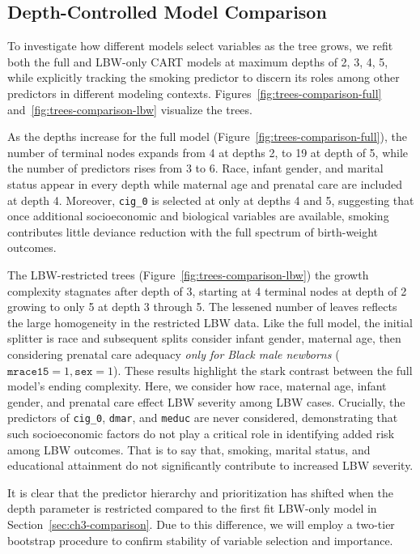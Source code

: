 \subsection{Depth-Controlled Model Comparison}
\label{sec:ch3-comparison-depth}

To investigate how different models select variables as the tree grows, we refit both the full and LBW-only CART models at maximum depths of 2, 3, 4, 5, while explicitly tracking the smoking predictor to discern its roles among other predictors in different modeling contexts. Figures~\ref{fig:trees-comparison-full} and~\ref{fig:trees-comparison-lbw} visualize the trees.

As the depths increase for the full model (Figure~\ref{fig:trees-comparison-full}), the number of terminal nodes expands from 4 at depths 2, to 19 at depth of 5, while the number of predictors rises from 3 to 6. Race, infant gender, and marital status appear in every depth while maternal age and prenatal care are included at depth 4. Moreover,  \texttt{cig\_0} is selected at only at depths 4 and 5, suggesting that once additional socioeconomic and biological variables are available, smoking contributes little deviance reduction with the full spectrum of birth-weight outcomes. 

The LBW-restricted trees (Figure~\ref{fig:trees-comparison-lbw}) the growth complexity stagnates after depth of 3, starting at 4 terminal nodes at depth of 2 growing to only 5 at depth 3 through 5. The lessened number of leaves reflects the large homogeneity in the restricted LBW data. Like the full model, the initial splitter is race and subsequent splits consider infant gender, maternal age, then considering prenatal care adequacy \emph{only for Black male newborns} (\(\texttt{mrace15} = 1, \texttt{sex}=1\)). These results highlight the stark contrast between the full model's ending complexity. Here, we consider how race, maternal age, infant gender, and prenatal care effect LBW severity among LBW cases. Crucially, the predictors of \texttt{cig\_0}, \texttt{dmar}, and \texttt{meduc} are never considered, demonstrating that such socioeconomic factors do not play a critical role in identifying added risk among LBW outcomes. That is to say that, smoking, marital status, and educational attainment do not significantly contribute to increased LBW severity.

It is clear that the predictor hierarchy and prioritization has shifted when the depth parameter is restricted compared to the first fit LBW-only model in Section~\ref{sec:ch3-comparison}. Due to this difference, we will employ a two-tier bootstrap procedure to confirm stability of variable selection and importance. 


